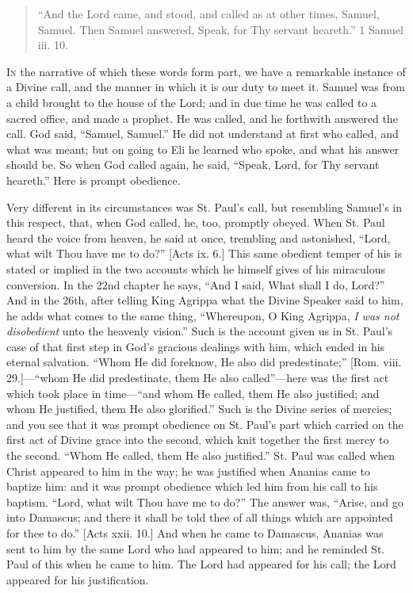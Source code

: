 
\begin{quote}

``And the Lord came, and stood, and called as at other times,
Samuel, Samuel. Then Samuel answered, Speak, for Thy servant heareth.''
1 Samuel iii. 10.

\end{quote}

I\textsc{n} the narrative of which these words form part, we have a
remarkable instance of a Divine call, and the manner in which it is
our duty to meet it. Samuel was from a child brought to the house of
the Lord; and in due time he was called to a sacred office, and made a
prophet. He was called, and he forthwith answered the call. God said,
``Samuel, Samuel.'' He did not understand at first who called,
and what was meant; but on going to Eli he learned who spoke, and what
his answer should be. So when God called again, he said, ``Speak,
Lord, for Thy servant heareth.'' Here is prompt obedience.

Very different in its circumstances was St. Paul's call, but
resembling Samuel's in this respect, that, when God called, he, too,
promptly obeyed. When St. Paul heard the voice from heaven, he said at
once, trembling and astonished, ``Lord, what wilt Thou have me to
do?'' [Acts ix. 6.] This same obedient temper of his is stated or
implied in the two accounts which he himself gives of his miraculous
conversion. In the 22nd chapter he says, ``And I said, What shall
I do, Lord?'' And in the 26th, after telling King Agrippa what the
Divine Speaker said to him, he adds what comes to the same thing,
``Whereupon, O King Agrippa, \emph{I was not disobedient} unto the
heavenly vision.'' Such is the account given us in St. Paul's case
of that first step in God's gracious dealings with him, which ended in
his eternal salvation. ``Whom He did foreknow, He also did
predestinate;'' [Rom. viii. 29.]—``whom He did predestinate,
them He also called''—here was the first act which took place in
time—``and whom He called, them He also justified; and whom He
justified, them He also glorified.'' Such is the Divine series of
mercies; and you see that it was prompt obedience on St. Paul's part
which carried on the first act of Divine grace into the second, which
knit together the first mercy to the second. ``Whom He called,
them He also justified.'' St. Paul was called when Christ appeared
to him in the way; he was justified when Ananias came to baptize him:
and it was prompt obedience which led him from his call to his
baptism. ``Lord, what wilt Thou have me to do?'' The answer
was, ``Arise, and go into Damascus; and there it shall be told
thee of all things which are appointed for thee to do.'' [Acts
xxii. 10.] And when he came to Damascus, Ananias was sent to him by
the same Lord who had appeared to him; and he reminded St. Paul of
this when he came to him. The Lord had appeared for his call; the Lord
appeared for his justification.

